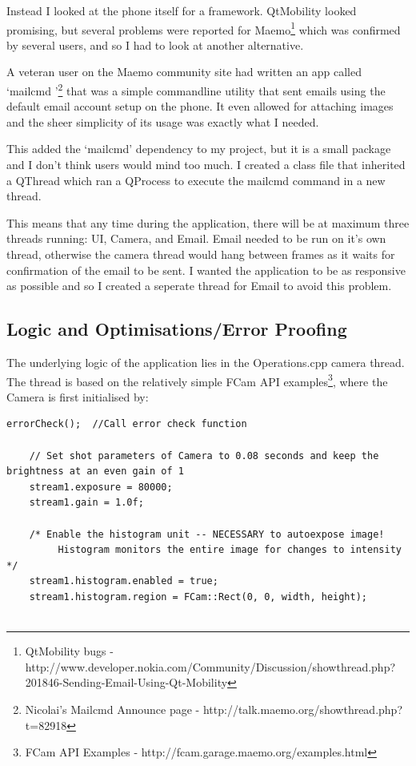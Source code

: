 \documentclass[11pt]{article} %
\begin{document}
{{Instead I looked at the phone itself for a framework.  QtMobility looked promising, but several problems were reported for Maemo\footnote{QtMobility bugs - http://www.developer.nokia.com/Community/Discussion/showthread.php?201846-Sending-Email-Using-Qt-Mobility}\label{ref:qtmobbug} which was confirmed by several users, and so I had to look at another alternative.

A veteran user on the Maemo community site had written an app called ‘mailcmd ’\footnote{Nicolai’s Mailcmd Announce page - http://talk.maemo.org/showthread.php?t=82918}\label{ref:mailcmd} that was a simple commandline utility that sent emails using the default email account setup on the phone. It even allowed for attaching images and the sheer simplicity of its usage was exactly what I needed.

This added the ‘mailcmd’ dependency to my project, but it is a small package and I don’t think users would mind too much. I created a class file that inherited a QThread which ran a QProcess to execute the mailcmd command in a new thread.

This means that any time during the application, there will be at maximum three threads running: UI, Camera, and Email. Email needed to be run on it’s own thread, otherwise the camera thread would hang between frames as it waits for confirmation of the email to be sent. I wanted the application to be as responsive as possible and so I created a seperate thread for Email to avoid this problem.

\subsection{Logic and Optimisations/Error Proofing}
The underlying logic of the application lies in the Operations.cpp camera thread. The thread is based on the relatively simple FCam API examples\footnote{FCam API Examples - http://fcam.garage.maemo.org/examples.html}\label{ref:fcamapi}, where the Camera is first initialised by:
\begin{lstlisting}[title=\bf Snippet initialise() function in Operations.cpp]
     errorCheck();  //Call error check function

    // Set shot parameters of Camera to 0.08 seconds and keep the brightness at an even gain of 1
    stream1.exposure = 80000;
    stream1.gain = 1.0f;

    /* Enable the histogram unit -- NECESSARY to autoexpose image!
         Histogram monitors the entire image for changes to intensity */
    stream1.histogram.enabled = true;
    stream1.histogram.region = FCam::Rect(0, 0, width, height); 


\end{lstlisting}}}
\end{document}
